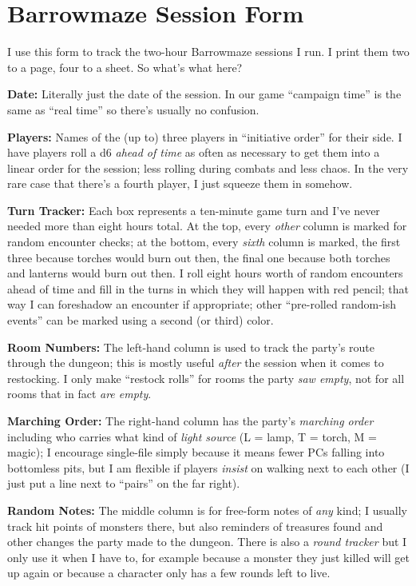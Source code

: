 
\section{Barrowmaze Session Form}

I use this form to track the two-hour Barrowmaze sessions I run.
I print them two to a page, four to a sheet. So what's what here?

\textbf{Date:}
%
Literally just the date of the session.
%
In our game ``campaign time'' is the same as ``real time'' so there's usually
no confusion.

\textbf{Players:}
%
Names of the (up to) three players in ``initiative order'' for their side.
%
I have players roll a d6 \emph{ahead of time} as often as necessary to get them
into a linear order for the session; less rolling during combats and less chaos.
%
In the very rare case that there's a fourth player, I just squeeze them in
somehow.

\textbf{Turn Tracker:}
%
Each box represents a ten-minute game turn and I've never needed more than
eight hours total.
%
At the top, every \emph{other} column is marked \monster{} for random encounter
checks; at the bottom, every \emph{sixth} column is marked, the first three
\torch{} because torches would burn out then, the final one \lantern{} because
both torches and lanterns would burn out then.
%
I roll eight hours worth of random encounters ahead of time and fill in the
turns in which they will happen with red pencil; that way I can foreshadow an
encounter if appropriate; other ``pre-rolled random-ish events'' can be marked
using a second (or third) color.



\textbf{Room Numbers:}
%
The left-hand column is used to track the party's route through the dungeon;
this is mostly useful \emph{after} the session when it comes to restocking.
%
I only make ``restock rolls'' for rooms the party \emph{saw empty}, not for all
rooms that in fact \emph{are empty}.

\textbf{Marching Order:}
%
The right-hand column has the party's \emph{marching order} including who
carries what kind of \emph{light source} (L = lamp, T = torch, M = magic); I
encourage single-file simply because it means fewer PCs falling into bottomless
pits, but I am flexible if players \emph{insist} on walking next to each other
(I just put a line next to ``pairs'' on the far right).

\textbf{Random Notes:}
%
The middle column is for free-form notes of \emph{any} kind; I usually track
hit points of monsters there, but also reminders of treasures found and other
changes the party made to the dungeon.
%
There is also a \emph{round tracker} but I only use it when I have to, for
example because a monster they just killed will get up again or because a
character only has a few rounds left to live.
